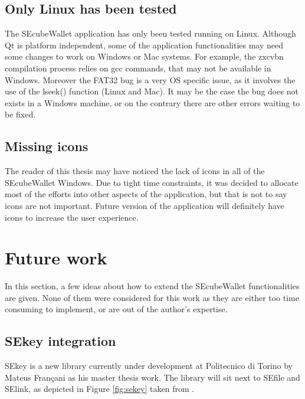 \subsection{Only Linux has been tested}

The SEcubeWallet application has only been tested running on Linux. Although Qt is platform independent, some of the application functionalities may need some changes to work on Windows or Mac systems. For example, the zxcvbn compilation process relies on gcc commands, that may not be available in Windows. Moreover the FAT32 bug is a very OS specific issue, as it involves the use of the lseek() function (Linux and Mac). It may be the case the bug does not exists in a Windows machine, or on the contrary there are other errors waiting to be fixed.


\subsection{Missing icons}
The reader of this thesis may have noticed the lack of icons in all of the SEcubeWallet Windows. Due to tight time constraints, it was decided to allocate most of the efforts into other aspects of the application, but that is not to say icons are not important. Future version of the application will definitely have icons to increase the user experience.


\section{Future work}
In this section, a few ideas about how to extend the SEcubeWallet functionalities are given. None of them were considered for this work as they are either too time consuming to implement, or are out of the author's expertise.


\subsection{SEkey integration}

SEkey is a new library currently under development at Politecnico di Torino by 	Mateus Françani as his master thesis work. The library will sit next to SEfile and SElink, as depicted in Figure \ref{fig:sekey} taken from \cite{sekey}.

